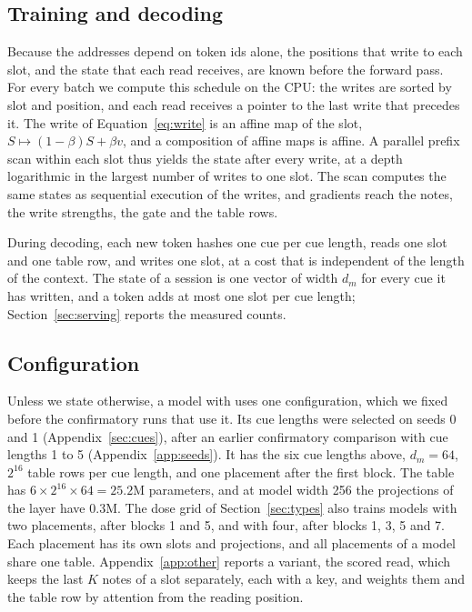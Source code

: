 \subsection{Training and decoding}
\label{sec:method-train}

Because the addresses depend on token ids alone, the positions that write to each slot, and the
state that each read receives, are known before the forward pass. For every batch we compute this
schedule on the CPU: the writes are sorted by slot and position, and each read receives a pointer
to the last write that precedes it. The write of Equation~\ref{eq:write} is an affine map of the
slot, $S \mapsto (1 - \beta) S + \beta v$, and a composition of affine maps is affine. A parallel
prefix scan within each slot \citep{hillis1986} thus yields the state after every write, at a
depth logarithmic in the largest number of writes to one slot. The scan computes the same states
as sequential execution of the writes, and gradients reach the notes, the write strengths, the
gate and the table rows.

During decoding, each new token hashes one cue per cue length, reads one slot and one table row,
and writes one slot, at a cost that is independent of the length of the context. The state of a
session is one vector of width $d_m$ for every cue it has written, and a token adds at most one
slot per cue length; Section~\ref{sec:serving} reports the measured counts.

\subsection{Configuration}
\label{sec:method-config}

Unless we state otherwise, a model with \ingram{} uses one configuration, which we fixed before
the confirmatory runs that use it. Its cue lengths were selected on seeds 0 and 1
(Appendix~\ref{sec:cues}), after an earlier confirmatory comparison with cue lengths 1 to 5
(Appendix~\ref{app:seeds}).
It has the six cue lengths above, $d_m = 64$, $2^{16}$ table rows per cue
length, and one placement after the first block. The table has $6 \times 2^{16} \times 64 =
25.2$M parameters, and at model width 256 the projections of the layer have 0.3M. The dose grid of
Section~\ref{sec:types} also trains models with two placements, after blocks 1 and 5, and with
four, after blocks 1, 3, 5 and 7. Each placement has its own slots and projections, and all
placements of a model share one table. Appendix~\ref{app:other} reports a variant, the scored
read, which keeps the last $K$ notes of a slot separately, each with a key, and weights them and
the table row by attention from the reading position.
